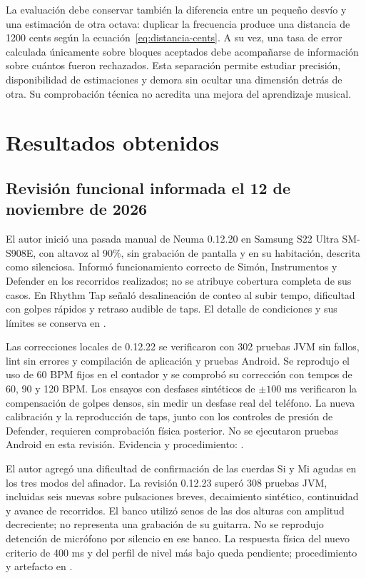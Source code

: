 La evaluación debe conservar también la diferencia entre un pequeño desvío y
una estimación de otra octava: duplicar la frecuencia produce una distancia de
1200 cents según la ecuación~\ref{eq:distancia-cents}. A su vez, una tasa de error
calculada únicamente sobre bloques aceptados debe acompañarse de información
sobre cuántos fueron rechazados. Esta separación permite estudiar precisión,
disponibilidad de estimaciones y demora sin ocultar una dimensión detrás de otra.
Su comprobación técnica no acredita una mejora del aprendizaje musical.


\section{Resultados obtenidos}
\subsection{Revisión funcional informada el 12 de noviembre de 2026}
El autor inició una pasada manual de Neuma 0.12.20 en Samsung S22 Ultra
SM-S908E, con altavoz al 90\%, sin grabación de pantalla y en su habitación,
descrita como silenciosa. Informó funcionamiento correcto de Simón,
Instrumentos y Defender en los recorridos realizados; no se atribuye cobertura
completa de sus casos. En Rhythm Tap señaló desalineación de conteo al subir
tempo, dificultad con golpes rápidos y retraso audible de taps. El detalle de
condiciones y sus límites se conserva en
.

Las correcciones locales de 0.12.22 se verificaron con 302 pruebas JVM sin
fallos, lint sin errores y compilación de aplicación y pruebas Android.
Se reprodujo el uso de 60 BPM fijos en el contador y se comprobó su corrección
con tempos de 60, 90 y 120 BPM. Los ensayos con desfases sintéticos de
$\pm100$ ms verificaron la compensación de golpes densos, sin medir un desfase
real del teléfono. La nueva calibración y la reproducción de taps, junto con
los controles de presión de Defender, requieren comprobación física posterior.
No se ejecutaron pruebas Android en esta revisión. Evidencia y procedimiento:
.

El autor agregó una dificultad de confirmación de las cuerdas Si y Mi agudas
en los tres modos del afinador. La revisión 0.12.23 superó 308 pruebas JVM,
incluidas seis nuevas sobre pulsaciones breves, decaimiento sintético,
continuidad y avance de recorridos. El banco utilizó senos de las dos alturas
con amplitud decreciente; no representa una grabación de su guitarra. No se
reprodujo detención de micrófono por silencio en ese banco. La respuesta física
del nuevo criterio de 400 ms y del perfil de nivel más bajo queda pendiente;
procedimiento y artefacto en .

